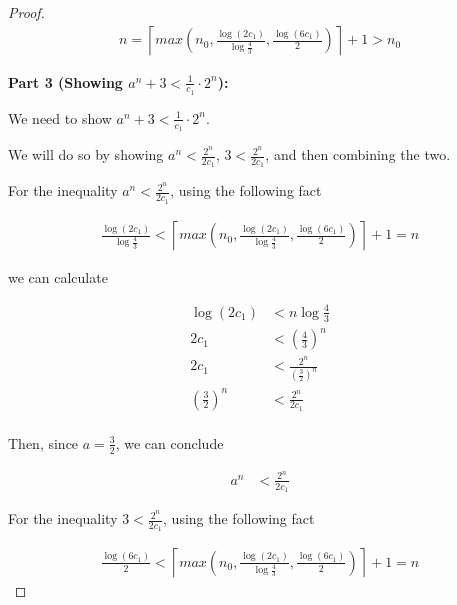 \documentclass[12pt]{article}
\begin{document}
\begin{itemize}
\begin{proof}
        \begin{align}
            n = \left\lceil max(n_0, \frac{\log(2c_1)}{\log \frac{4}{3}}, \frac{\log(6c_1)}{2}) \right\rceil + 1 > n_0
        \end{align}

        \bigskip

        \textbf{Part 3 (Showing $a^n + 3 < \frac{1}{c_1} \cdot 2^n$):}

        \bigskip

        We need to show $a^n + 3 < \frac{1}{c_1} \cdot 2^n$.

        \bigskip

        We will do so by showing $a^n < \frac{2^n}{2c_1}$, $3 < \frac{2^n}{2c_1}$,
        and then combining the two.

        \bigskip

        For the inequality $a^n < \frac{2^n}{2c_1}$, using the following fact

        \begin{align}
            \frac{\log(2c_1)}{\log \frac{4}{3}} < \left\lceil max(n_0, \frac{\log(2c_1)}{\log \frac{4}{3}}, \frac{\log(6c_1)}{2}) \right\rceil + 1 = n
        \end{align}

        we can calculate

        \begin{align}
            \log(2c_1) &< n\log \frac{4}{3}\\
            2c_1 &< \left(\frac{4}{3}\right)^n\\
            2c_1 &< \frac{2^n}{\left(\frac{3}{2}\right)^n}\\
            \left(\frac{3}{2}\right)^n &< \frac{2^n}{2c_1}\\
        \end{align}

        Then, since $a = \frac{3}{2}$, we can conclude

        \begin{align}
            a^n &< \frac{2^n}{2c_1}
        \end{align}

        \bigskip

        For the inequality $3 < \frac{2^n}{2c_1}$, using the following fact

        \begin{align}
            \frac{\log(6c_1)}{2} < \left\lceil max(n_0, \frac{\log(2c_1)}{\log \frac{4}{3}}, \frac{\log(6c_1)}{2}) \right\rceil + 1 = n
        \end{align}


\end{proof}
\end{itemize}
\end{document}
